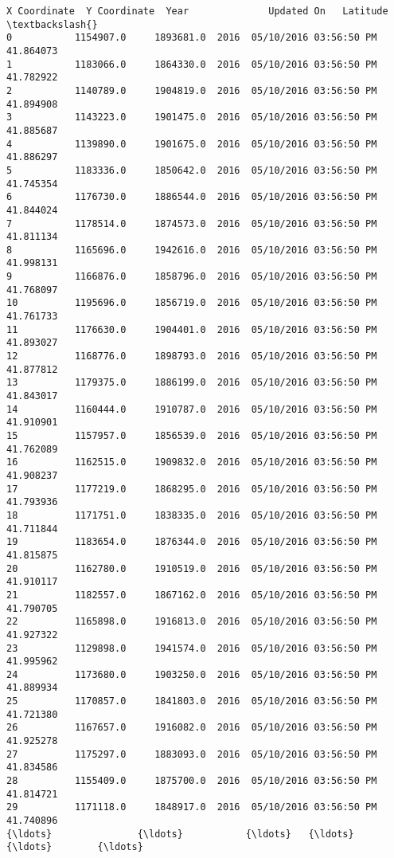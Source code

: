 \documentclass[11pt]{article}
\begin{document}
\begin{Verbatim}[commandchars=\\\{\}]
         X Coordinate  Y Coordinate  Year              Updated On   Latitude  \textbackslash{}
0           1154907.0     1893681.0  2016  05/10/2016 03:56:50 PM  41.864073   
1           1183066.0     1864330.0  2016  05/10/2016 03:56:50 PM  41.782922   
2           1140789.0     1904819.0  2016  05/10/2016 03:56:50 PM  41.894908   
3           1143223.0     1901475.0  2016  05/10/2016 03:56:50 PM  41.885687   
4           1139890.0     1901675.0  2016  05/10/2016 03:56:50 PM  41.886297   
5           1183336.0     1850642.0  2016  05/10/2016 03:56:50 PM  41.745354   
6           1176730.0     1886544.0  2016  05/10/2016 03:56:50 PM  41.844024   
7           1178514.0     1874573.0  2016  05/10/2016 03:56:50 PM  41.811134   
8           1165696.0     1942616.0  2016  05/10/2016 03:56:50 PM  41.998131   
9           1166876.0     1858796.0  2016  05/10/2016 03:56:50 PM  41.768097   
10          1195696.0     1856719.0  2016  05/10/2016 03:56:50 PM  41.761733   
11          1176630.0     1904401.0  2016  05/10/2016 03:56:50 PM  41.893027   
12          1168776.0     1898793.0  2016  05/10/2016 03:56:50 PM  41.877812   
13          1179375.0     1886199.0  2016  05/10/2016 03:56:50 PM  41.843017   
14          1160444.0     1910787.0  2016  05/10/2016 03:56:50 PM  41.910901   
15          1157957.0     1856539.0  2016  05/10/2016 03:56:50 PM  41.762089   
16          1162515.0     1909832.0  2016  05/10/2016 03:56:50 PM  41.908237   
17          1177219.0     1868295.0  2016  05/10/2016 03:56:50 PM  41.793936   
18          1171751.0     1838335.0  2016  05/10/2016 03:56:50 PM  41.711844   
19          1183654.0     1876344.0  2016  05/10/2016 03:56:50 PM  41.815875   
20          1162780.0     1910519.0  2016  05/10/2016 03:56:50 PM  41.910117   
21          1182557.0     1867162.0  2016  05/10/2016 03:56:50 PM  41.790705   
22          1165898.0     1916813.0  2016  05/10/2016 03:56:50 PM  41.927322   
23          1129898.0     1941574.0  2016  05/10/2016 03:56:50 PM  41.995962   
24          1173680.0     1903250.0  2016  05/10/2016 03:56:50 PM  41.889934   
25          1170857.0     1841803.0  2016  05/10/2016 03:56:50 PM  41.721380   
26          1167657.0     1916082.0  2016  05/10/2016 03:56:50 PM  41.925278   
27          1175297.0     1883093.0  2016  05/10/2016 03:56:50 PM  41.834586   
28          1155409.0     1875700.0  2016  05/10/2016 03:56:50 PM  41.814721   
29          1171118.0     1848917.0  2016  05/10/2016 03:56:50 PM  41.740896   
{\ldots}               {\ldots}           {\ldots}   {\ldots}                     {\ldots}        {\ldots}   

\end{Verbatim}
\end{document}
